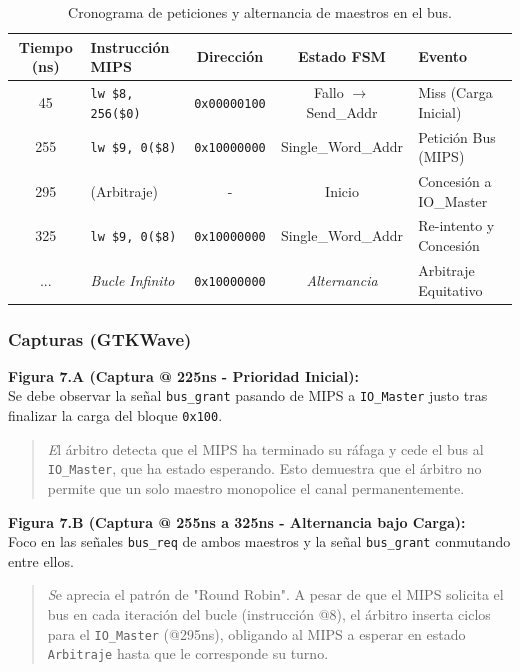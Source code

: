 \documentclass[12pt,a4paper]{article}
\begin{document}
\begin{table}[H]
\centering
\small
\renewcommand{\arraystretch}{1.2}
\begin{tabular}{|c|l|c|c|l|}
\hline
\rowcolor[HTML]{EFEFEF} 
\textbf{Tiempo (ns)} & \textbf{Instrucción MIPS} & \textbf{Dirección} & \textbf{Estado FSM} & \textbf{Evento} \\ \hline
45  & \texttt{lw \$8, 256(\$0)}  & \texttt{0x00000100} & Fallo $\rightarrow$ Send\_Addr & Miss (Carga Inicial) \\ \hline
255 & \texttt{lw \$9, 0(\$8)}    & \texttt{0x10000000} & Single\_Word\_Addr    & Petición Bus (MIPS) \\ \hline
295 & (Arbitraje)                & -                  & Inicio                & Concesión a IO\_Master \\ \hline
325 & \texttt{lw \$9, 0(\$8)}    & \texttt{0x10000000} & Single\_Word\_Addr    & Re-intento y Concesión \\ \hline
... & \textit{Bucle Infinito}    & \texttt{0x10000000} & \textit{Alternancia}  & Arbitraje Equitativo \\ \hline
\end{tabular}
\caption{Cronograma de peticiones y alternancia de maestros en el bus.}
\end{table}

\subsubsection{Capturas (GTKWave)}

\textbf{Figura 7.A (Captura @ 225ns - Prioridad Inicial):} \\
Se debe observar la señal \texttt{bus\_grant} pasando de MIPS a \texttt{IO\_Master} justo tras finalizar la carga del bloque \texttt{0x100}.
\begin{quote}
    \textit El árbitro detecta que el MIPS ha terminado su ráfaga y cede el bus al \texttt{IO\_Master}, que ha estado esperando. Esto demuestra que el árbitro no permite que un solo maestro monopolice el canal permanentemente.
\end{quote}

\textbf{Figura 7.B (Captura @ 255ns a 325ns - Alternancia bajo Carga):} \\
Foco en las señales \texttt{bus\_req} de ambos maestros y la señal \texttt{bus\_grant} conmutando entre ellos.
\begin{quote}
    \textit Se aprecia el patrón de "Round Robin". A pesar de que el MIPS solicita el bus en cada iteración del bucle (instrucción @8), el árbitro inserta ciclos para el \texttt{IO\_Master} (@295ns), obligando al MIPS a esperar en estado \texttt{Arbitraje} hasta que le corresponde su turno.
\end{quote}
\end{document}
